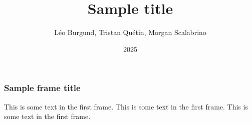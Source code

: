 \documentclass[aspectratio=169]{beamer}
\title{Sample title}
\author{Léo Burgund, Tristan Quétin, Morgan Scalabrino}
\institute{Université Paris-Saclay}
\date{2025}
\begin{document}
\frame{\titlepage}

\begin{frame}
  \frametitle{Sample frame title}
  This is some text in the first frame. This is some text in the first frame. This is some text in the first frame.
\end{frame}
\end{document}

